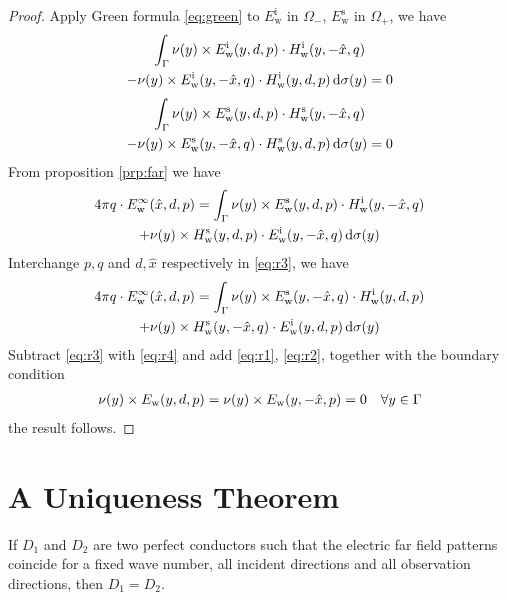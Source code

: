 \begin{proof}
  Apply Green formula \eqref{eq:green} to $E_\text{w}^\text{i}$ in $\Omega_-$, $E_\text{w}^\text{s}$ in $\Omega_+$, we have
  \begin{multline}
    \int_{\Gamma}\nu(y)\times E_\text{w}^\text{i}(y, d, p)\cdot H_\text{w}^\text{i}(y, -\hat{x}, q) \\- \nu(y)\times E_\text{w}^\text{i}(y, -\hat{x}, q)\cdot H_\text{w}^\text{i}(y, d, p)\,\text{d}\sigma(y) = 0 \label{eq:r1} 
  \end{multline}
  \begin{multline}
    \int_{\Gamma}\nu(y)\times E_\text{w}^\text{s}(y, d, p)\cdot H_\text{w}^\text{s}(y, -\hat{x}, q) \\- \nu(y)\times E_\text{w}^\text{s}(y, -\hat{x}, q)\cdot H_\text{w}^\text{s}(y, d, p)\,\text{d}\sigma(y) = 0 \label{eq:r2}
  \end{multline}
  From proposition \eqref{prp:far} we have
  \begin{multline}\label{eq:r3}
    4\pi q\cdot E_\text{w}^\infty(\hat{x}, d, p) = \int_{\Gamma}\nu(y)\times E_\text{w}^\text{s}(y, d, p)\cdot H_\text{w}^\text{i}(y, -\hat{x}, q) \\+ \nu(y)\times H_\text{w}^\text{s}(y, d, p)\cdot E_\text{w}^\text{i}(y, -\hat{x}, q)\,\text{d}\sigma(y) 
  \end{multline}
  Interchange $p, q$ and $d, \hat{x}$ respectively in \eqref{eq:r3}, we have 
  \begin{multline}\label{eq:r4}
    4\pi q\cdot E_\text{w}^\infty(\hat{x}, d, p) = \int_{\Gamma}\nu(y)\times E_\text{w}^\text{s}(y, -\hat{x}, q)\cdot H_\text{w}^\text{i}(y, d, p) \\+ \nu(y)\times H_\text{w}^\text{s}(y, -\hat{x}, q)\cdot E_\text{w}^\text{i}(y, d, p)\,\text{d}\sigma(y) 
  \end{multline}
  Subtract \eqref{eq:r3} with \eqref{eq:r4} and add \eqref{eq:r1}, \eqref{eq:r2}, together with the boundary condition 
  \begin{align*}
    \nu(y)\times E_\text{w}(y, d, p)=\nu(y)\times E_\text{w}(y, -\hat{x}, p)=0\quad\forall y\in\Gamma
  \end{align*}
  the result follows. 
\end{proof}

\section{A Uniqueness Theorem}
\begin{thm}
  If $D_1$ and $D_2$ are two perfect conductors such that the electric far field patterns coincide for a fixed wave number, all incident directions and all observation directions, then $D_1=D_2$.
\end{thm}

